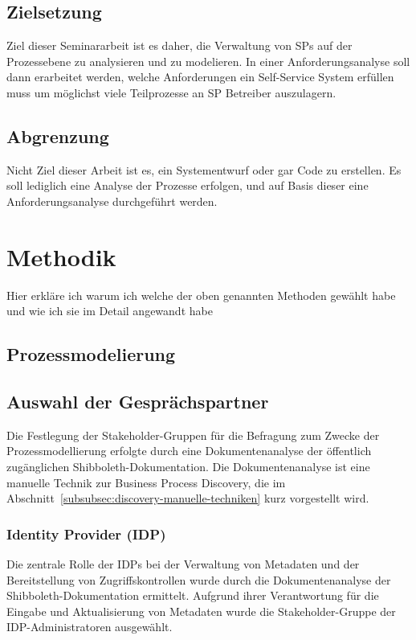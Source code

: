 \documentclass[a4paper, fontsize=12pt]{scrartcl}
\begin{document}
\subsection{Zielsetzung}\label{subsec:zielsetzung}
Ziel dieser Seminararbeit ist es daher, die Verwaltung von SPs auf der Prozessebene zu analysieren und zu modelieren.
In einer Anforderungsanalyse soll dann erarbeitet werden, welche Anforderungen ein Self-Service System erfüllen muss um möglichst viele Teilprozesse an SP Betreiber auszulagern.
\subsection{Abgrenzung}\label{subsec:abgrenzung}
Nicht Ziel dieser Arbeit ist es, ein Systementwurf oder gar Code zu erstellen.
Es soll lediglich eine Analyse der Prozesse erfolgen, und auf Basis dieser eine Anforderungsanalyse durchgeführt werden.




\section{Methodik}\label{sec:methodik}
Hier erkläre ich warum ich welche der oben genannten Methoden gewählt habe und wie ich sie im Detail angewandt habe
\subsection{Prozessmodelierung}\label{subsec:prozessmodelierung-methodik}
\subsection{Auswahl der Gesprächspartner}\label{subsubsec:auswahl-gespraechspartner}
Die Festlegung der Stakeholder-Gruppen für die Befragung zum Zwecke der Prozessmodellierung erfolgte durch eine Dokumentenanalyse der öffentlich zugänglichen Shibboleth-Dokumentation. 
Die Dokumentenanalyse ist eine manuelle Technik zur Business Process Discovery, die im Abschnitt~\ref{subsubsec:discovery-manuelle-techniken} kurz vorgestellt wird. 

\subsubsection{Identity Provider (IDP)}
Die zentrale Rolle der IDPs bei der Verwaltung von Metadaten und der Bereitstellung von Zugriffskontrollen wurde durch die Dokumentenanalyse der Shibboleth-Dokumentation ermittelt. 
Aufgrund ihrer Verantwortung für die Eingabe und Aktualisierung von Metadaten wurde die Stakeholder-Gruppe der IDP-Administratoren ausgewählt.
\end{document}
